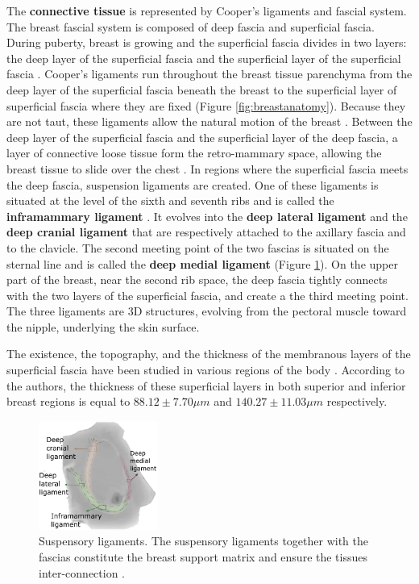 The \textbf{connective tissue} is represented by Cooper's ligaments and fascial system. The breast fascial system is composed of deep fascia and superficial fascia. During puberty, breast is growing and the superficial fascia divides in two layers: the deep layer of the superficial fascia and the superficial layer of the superficial fascia \citep{kopans2007breast}.  Cooper's ligaments run throughout the breast tissue parenchyma from the deep layer of the superficial fascia beneath the breast to the superficial layer of superficial fascia where they are fixed (Figure \ref{fig:breastanatomy}). Because they are not taut, these ligaments allow the natural motion of the breast \citep{clemente2011anatomy}. Between the deep layer of the superficial fascia and the superficial layer of the deep fascia, a layer of connective loose tissue form the retro-mammary space, allowing the breast tissue to slide over the chest \citep{mugea2014aesthetic}. In regions where the superficial fascia meets the deep fascia, suspension ligaments are created. One of these ligaments is situated at the level of the sixth and seventh ribs and is called the \textbf{inframammary ligament} \citep{bayati_inframammary_1995}. It evolves into the \textbf{deep lateral ligament} and the \textbf{deep cranial ligament} that are respectively attached to the axillary fascia and to the clavicle. The second meeting point of the two fascias is situated on the sternal line and is called the \textbf{deep medial ligament} (Figure \ref{fig:suspensoryligaments}). On the upper part of the breast, near the second rib space, the deep fascia tightly connects with the two layers of the superficial fascia, and create a the third meeting point. The three ligaments are 3D structures, evolving from the pectoral muscle toward the nipple, underlying the skin surface.


The existence, the topography, and the thickness of the membranous layers of the superficial fascia have been studied in various regions of the body \citep{abu_membranous_2006}. According to the authors, the thickness of these superficial layers in both superior and inferior breast regions is equal to $88.12 \pm 7.70 \mu m$ and $140.27 \pm 11.03 \mu m$ respectively.

\begin{figure}[!h]
\centering
\centerline{\includegraphics[width=0.35\textwidth,keepaspectratio]{figures/breastLigaments.png} }
\caption{Suspensory ligaments. The suspensory ligaments together with the fascias constitute the breast support matrix and ensure the tissues inter-connection  \citep{mugea2014aesthetic}.}
\label{fig:suspensoryligaments}
\end{figure}


